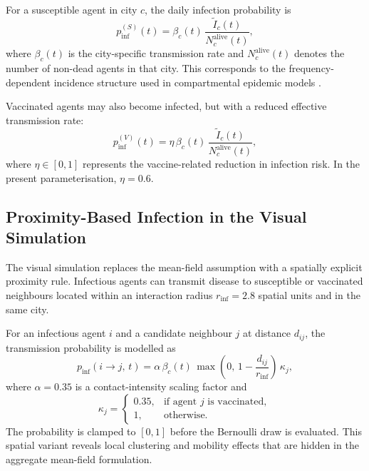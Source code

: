 For a susceptible agent in city $c$, the daily infection probability is
\begin{equation}
  p_{\mathrm{inf}}^{(S)}(t) = \beta_c(t)\,\frac{\tilde{I}_c(t)}{N_c^{\mathrm{alive}}(t)},
  \label{eq:pinf_S}
\end{equation}
where $\beta_c(t)$ is the city-specific transmission rate and $N_c^{\mathrm{alive}}(t)$ denotes the number of non-dead agents in that city.
This corresponds to the frequency-dependent incidence structure used in compartmental epidemic models \citep{zhang2025}.

Vaccinated agents may also become infected, but with a reduced effective transmission rate:
\begin{equation}
  p_{\mathrm{inf}}^{(V)}(t) = \eta\,\beta_c(t)\,\frac{\tilde{I}_c(t)}{N_c^{\mathrm{alive}}(t)},
  \label{eq:pinf_V}
\end{equation}
where $\eta \in [0, 1]$ represents the vaccine-related reduction in infection risk.
In the present parameterisation, $\eta = 0.6$.

\subsection{Proximity-Based Infection in the Visual Simulation}
\label{sec:proximity}

The visual simulation replaces the mean-field assumption with a spatially explicit proximity rule.
Infectious agents can transmit disease to susceptible or vaccinated neighbours located within an interaction radius $r_{\mathrm{inf}} = 2.8$ spatial units and in the same city.

For an infectious agent $i$ and a candidate neighbour $j$ at distance $d_{ij}$, the transmission probability is modelled as
\begin{equation}
  p_{\mathrm{inf}}(i \to j,\, t) = \alpha\,\beta_c(t)\,\max\!\left(0,\, 1 - \frac{d_{ij}}{r_{\mathrm{inf}}}\right)\,\kappa_j,
  \label{eq:prox_inf}
\end{equation}
where $\alpha = 0.35$ is a contact-intensity scaling factor and
\begin{equation}
  \kappa_j = \begin{cases} 0.35, & \text{if agent } j \text{ is vaccinated}, \\ 1, & \text{otherwise.} \end{cases}
\end{equation}
The probability is clamped to $[0, 1]$ before the Bernoulli draw is evaluated.
This spatial variant reveals local clustering and mobility effects that are hidden in the aggregate mean-field formulation.

